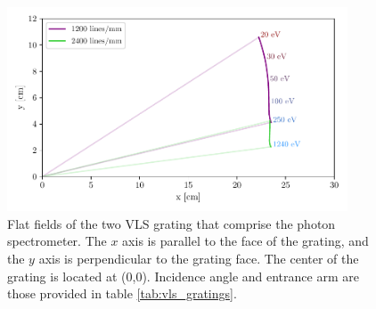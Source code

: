 \begin{figure}
	\centering
	\includegraphics[width=0.9\textwidth]{figures/Beamline/VLS_flat_field.pdf}
	\caption[Flat field of VLS gratings]{Flat fields of the two VLS grating that comprise the photon spectrometer.  The $x$ axis is parallel to the face of the grating, and the $y$ axis is perpendicular to the grating face.  The center of the grating is located at (0,0).  Incidence angle and entrance arm are those provided in table \ref{tab:vls_gratings}.}
	\label{fig:VLS_flat_field}
\end{figure}

